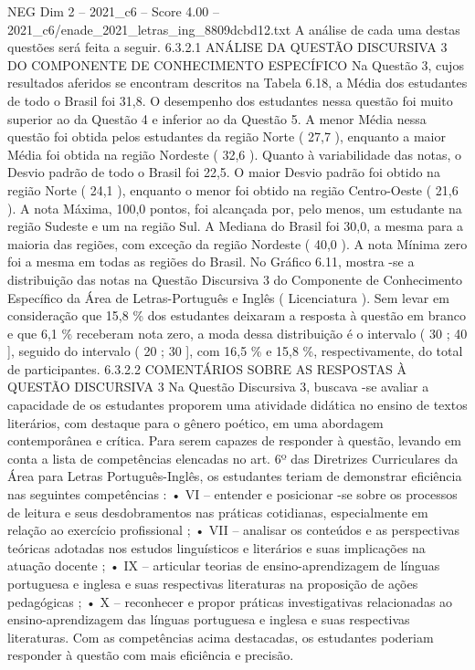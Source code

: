 \begin{textsample}{NEG Dim 2 – 2021\_c6 – Score 4.00 – 2021\_c6/enade\_2021\_letras\_ing\_8809dcbd12.txt}
A análise de cada uma destas questões será feita a seguir. 6.3.2.1 ANÁLISE DA QUESTÃO DISCURSIVA 3 DO COMPONENTE DE CONHECIMENTO ESPECÍFICO Na Questão 3, cujos resultados aferidos se encontram descritos na Tabela 6.18, a Média dos estudantes de todo o Brasil foi 31,8.
O desempenho dos estudantes nessa questão foi muito superior ao da Questão 4 e inferior ao da Questão 5.
A menor Média nessa questão foi obtida pelos estudantes da região Norte ( 27,7 ), enquanto a maior Média foi obtida na região Nordeste ( 32,6 ).
Quanto à variabilidade das notas, o Desvio padrão de todo o Brasil foi 22,5.
O maior Desvio padrão foi obtido na região Norte ( 24,1 ), enquanto o menor foi obtido na região Centro-Oeste ( 21,6 ).
A nota Máxima, 100,0 pontos, foi alcançada por, pelo menos, um estudante na região Sudeste e um na região Sul.
A Mediana do Brasil foi 30,0, a mesma para a maioria das regiões, com exceção da região Nordeste ( 40,0 ).
A nota Mínima zero foi a mesma em todas as regiões do Brasil.
No Gráfico 6.11, mostra -se a distribuição das notas na Questão Discursiva 3 do Componente de Conhecimento Específico da Área de Letras-Português e Inglês ( Licenciatura ).
Sem levar em consideração que 15,8 \% dos estudantes deixaram a resposta à questão em branco e que 6,1 \% receberam nota zero, a moda dessa distribuição é o intervalo ( 30 ; 40 ], seguido do intervalo ( 20 ; 30 ], com 16,5 \% e 15,8 \%, respectivamente, do total de participantes. 6.3.2.2 COMENTÁRIOS SOBRE AS RESPOSTAS À QUESTÃO DISCURSIVA 3 Na Questão Discursiva 3, buscava -se avaliar a capacidade de os estudantes proporem uma atividade didática no ensino de textos literários, com destaque para o gênero poético, em uma abordagem contemporânea e crítica.
Para serem capazes de responder à questão, levando em conta a lista de competências elencadas no art. 6º das Diretrizes Curriculares da Área para Letras Português-Inglês, os estudantes teriam de demonstrar eficiência nas seguintes competências : • VI – entender e posicionar -se sobre os processos de leitura e seus desdobramentos nas práticas cotidianas, especialmente em relação ao exercício profissional ; • VII – analisar os conteúdos e as perspectivas teóricas adotadas nos estudos linguísticos e literários e suas implicações na atuação docente ; • IX – articular teorias de ensino-aprendizagem de línguas portuguesa e inglesa e suas respectivas literaturas na proposição de ações pedagógicas ; • X – reconhecer e propor práticas investigativas relacionadas ao ensino-aprendizagem das línguas portuguesa e inglesa e suas respectivas literaturas.
Com as competências acima destacadas, os estudantes poderiam responder à questão com mais eficiência e precisão.

\end{textsample}
